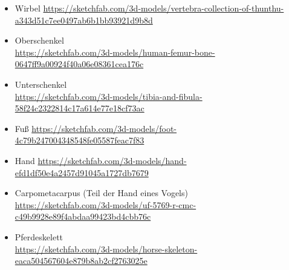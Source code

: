 \begin{itemize}
 \item Wirbel \url{https://sketchfab.com/3d-models/vertebra-collection-of-thunthu-a343d51c7ee0497ab6b1bb93921d9b8d}
 \item Oberschenkel\\ \url{https://sketchfab.com/3d-models/human-femur-bone-0647ff9a00924f40a06e08361cea176c}
 \item Unterschenkel\\ \url{https://sketchfab.com/3d-models/tibia-and-fibula-58f24c2322814c17a614e77e18cf73ac}
 \item Fuß \url{https://sketchfab.com/3d-models/foot-4c79b247004348548fe05587feac7f83}
 \item Hand \url{https://sketchfab.com/3d-models/hand-efd1df50e4a2457d91045a1727db7679}
 \item Carpometacarpus (Teil der Hand eines Vogels)\\ \url{https://sketchfab.com/3d-models/uf-5769-r-cmc-c49b9928e89f4abdaa99423bd4cbb76c}
 \item Pferdeskelett\\ \url{https://sketchfab.com/3d-models/horse-skeleton-eaca504567604e879b8ab2cf2763025e}
\end{itemize}

 
